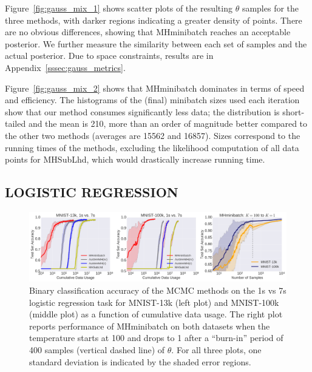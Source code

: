\documentclass[letterpaper]{article}
\begin{document}
Figure~\ref{fig:gauss_mix_1} shows scatter plots of the resulting $\theta$
samples for the three methods, with darker regions indicating a greater density
of points. There are no obvious differences, showing that {\sc MHminibatch}
reaches an acceptable posterior. We further measure the similarity between each
set of samples and the actual posterior. Due to space constraints, results are
in Appendix~\ref{sssec:gauss_metrics}.

Figure~\ref{fig:gauss_mix_2} shows that {\sc MHminibatch} dominates in terms of
speed and efficiency. The histograms of the (final) minibatch sizes used each
iteration show that our method consumes significantly less data; the
distribution is short-tailed and the mean is 210, more than an order of
magnitude better compared to the other two methods (averages are 15562 and
16857). Sizes correspond to the running times of the methods, excluding the
likelihood computation of all data points for {\sc MHSubLhd}, which would
drastically increase running time.


\subsection{LOGISTIC REGRESSION}\label{ssec:logistic}

\begin{figure}[t]
	\centering
	\includegraphics[width=1.0\linewidth]{logistic_regression_error_regions.png}
	\caption{
    Binary classification accuracy of the MCMC methods on the 1s vs 7s logistic
    regression task for MNIST-13k (left plot) and MNIST-100k (middle plot) as a
    function of cumulative data usage.  The right plot reports performance of
    {\sc MHminibatch} on both datasets when the temperature starts at 100 and
    drops to 1 after a ``burn-in'' period of 400 samples (vertical dashed line)
    of $\theta$.  For all three plots, one standard deviation is indicated by
    the shaded error regions.
    }
	\label{fig:logistic_performance}
\end{figure}
\end{document}
